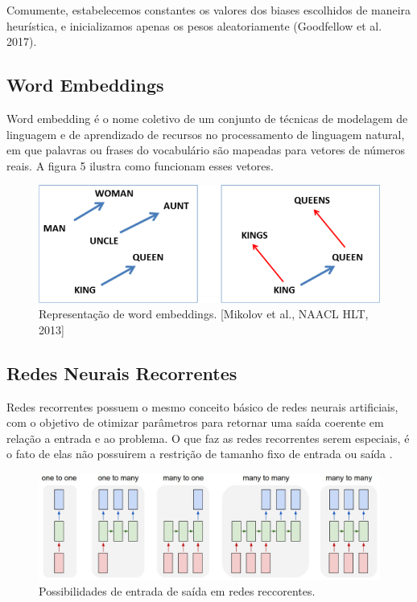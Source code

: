 \documentclass[12pt]{article}
\begin{document}
Comumente, estabelecemos constantes os valores dos biases escolhidos de maneira heurística, e inicializamos apenas os pesos aleatoriamente (Goodfellow et al. 2017).

\subsection{Word Embeddings}

Word embedding é o nome coletivo de um conjunto de técnicas de modelagem de linguagem e de aprendizado de recursos no processamento de linguagem natural, em que palavras ou frases do vocabulário são mapeadas para vetores de números reais. A figura 5 ilustra como funcionam esses vetores.
\begin{figure}
  \centering
  \includegraphics[width=1\textwidth]{images/wordembeddings.png}
  \caption{
    Representação de word embeddings. [Mikolov et al., NAACL HLT, 2013]
  }
  \label{}
\end{figure}

\subsection{Redes Neurais Recorrentes}

Redes recorrentes possuem o mesmo conceito básico de redes neurais artificiais, com o objetivo de otimizar parâmetros para retornar uma saída coerente em relação a entrada e ao problema. O que faz as redes recorrentes serem especiais, é o fato de elas não possuirem a restrição de tamanho fixo de entrada ou saída \cite{karpathy:2015}.

\begin{figure}[ht]
\centering
\includegraphics[width=1\textwidth]{images/rnn-effectiveness-examples.jpeg}
\caption{
    Possibilidades de entrada de saída em redes reccorentes. \cite{karpathy:2015}
}
\label{fig:sigmoid}
\end{figure}
\end{document}
